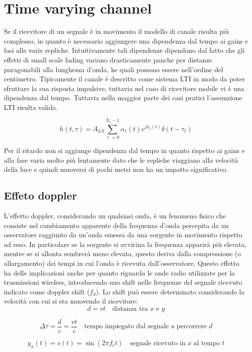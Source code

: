 \section*{Time varying channel}
Se il ricevitore di un segnale è in movimento il modello di canale risulta più complesso, in quanto è necessario aggiungere una dipendenza dal tempo ai gains e fasi alle varie repliche. Intuitivamente tali dipendenze dipendono dal fatto che gli effetti di small scale fading variano drasticamente panche per distanze paragonabili alla lunghezza d'onda, ke quali possono essere nell'ordine del centimetro. Tipicamente il canale è descritto come sistema LTI in modo da poter sfruttare la sua risposta impulsive, tuttavia nel caso di ricevitore mobile vi è una dipendenza dal tempo. Tuttavia nella maggior parte dei casi pratici l'assunzione LTI risulta valida. 

\[
    h(t, \tau) = A_{LS} \sum_{\ell=0}^{N_c-1} \alpha_{\ell}(t) e^{j\phi_{\ell}(t)} \delta(t - \tau_{\ell})
\]


Per il ritardo non si aggiunge dipendenza dal tempo in quanto rispetto ai gains e alla fase varia molto più lentamente dato che le repliche viaggiano alla velocità della luce e quindi muoversi di pochi metri non ha un impatto significativo.

\subsection*{Effeto doppler}
L'effetto doppler, considerando un qualsiasi onda, è un fenomeno fisico che consiste nel cambiamento apparente della frequenza d'onda percepita da un osservatore raggiunto da un'onda emessa da una sorgente in movimento rispetto ad esso. In particolare se la sorgente si avvicina la frequenza apparirà più elevata, mentre se si allonta sembrerà meno elevata, questo deriva dalla compressione (o allargamento) dei tempi in cui l'onda è ricevuta dall'osservatore. Questo effetto ha delle implicazioni anche per quanto riguarda le onde radio utilizzate per la trasmissioni wireless, introducendo uno shift nelle frequenze del segnale ricevuto indicato come doppler shift ($f_d$). Lo shift può essere determinato considerando la velocità con cui si sta muovendo il ricevitore:
\[
    d = vt \quad \text{distanza tra $x$ e $y$}
\]  

\[
    \Delta \tau = \frac{d}{c} = \frac{vt}{c} \quad \text{tempo impiegato dal segnale a percorrere $d$}
\]

\[
    y_x(t) = s(t) = \sin(2\pi f_c t) \quad \text{segnale ricevuto in $x$ al tempo $t$}
\]

